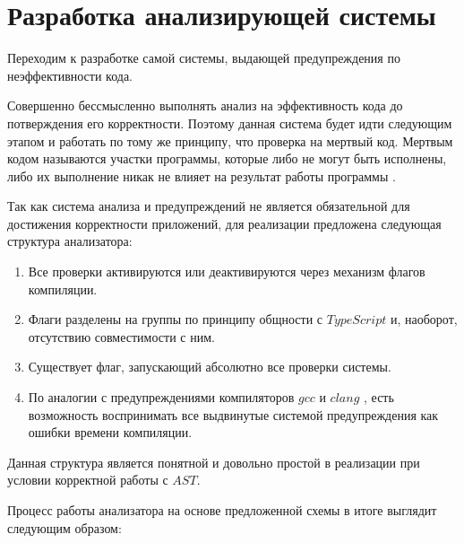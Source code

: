 \documentclass{mipt-thesis-bs}
\begin{document}
\section{Разработка анализирующей системы}

Переходим к разработке самой системы, выдающей предупреждения по неэффективности кода.

Совершенно бессмысленно выполнять
анализ на эффективность кода до потверждения его корректности.
Поэтому данная система будет идти следующим этапом и работать по тому же принципу, что
проверка на мертвый код. Мертвым кодом называются участки программы,
которые либо не могут быть исполнены, либо их выполнение никак не влияет на
результат работы программы \cite{dragon-book}.

Так как система анализа и предупреждений не является обязательной для
достижения корректности приложений, для реализации предложена
следующая структура анализатора:
\begin{enumerate}
    \item Все проверки активируются или
    деактивируются через механизм флагов компиляции.
    \item Флаги разделены на группы по
    принципу общности с $TypeScript$ и, наоборот, отсутствию совместимости с ним.
    \item Существует флаг, запускающий абсолютно все проверки системы.
    \item По аналогии с предупреждениями компиляторов $gcc$ и $clang$ \cite{clang-tidy},
    есть возможность воспринимать все выдвинутые системой предупреждения
    как ошибки времени компиляции.
\end{enumerate}

Данная структура является понятной и довольно простой в реализации при условии
корректной работы с $AST$.

Процесс работы анализатора на основе предложенной схемы в итоге выглядит следующим образом:
\end{document}
